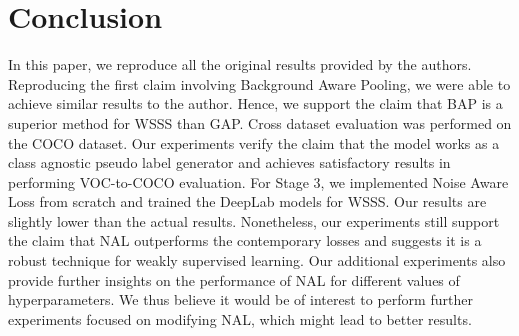 


\section{Conclusion}
In this paper, we reproduce all the original results provided by the authors. Reproducing the first claim involving Background Aware Pooling, we were able to achieve similar results to the author. Hence, we support the claim that BAP is a superior method for WSSS than GAP. Cross dataset evaluation was performed on the COCO dataset. Our experiments verify the claim that the model works as a class agnostic pseudo label generator and achieves satisfactory results in performing VOC-to-COCO evaluation. For Stage 3, we implemented Noise Aware Loss from scratch and trained the DeepLab models for WSSS. Our results are slightly lower than the actual results. Nonetheless, our experiments still support the claim that NAL outperforms the contemporary losses and suggests it is a robust technique for weakly supervised learning. Our additional experiments also provide further insights on the performance of NAL for different values of hyperparameters. We thus believe it would be of interest to perform further experiments focused on modifying NAL, which might lead to better results.
